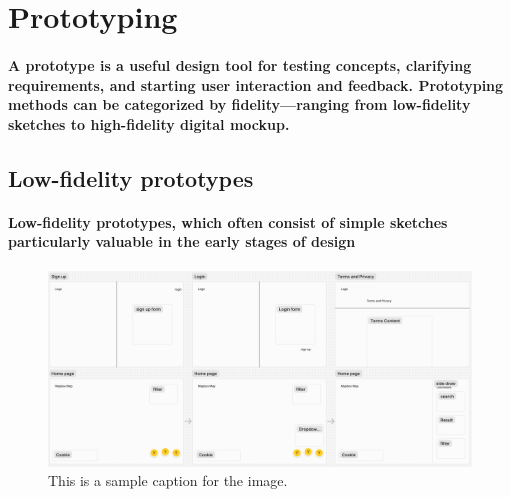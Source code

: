\section{Prototyping}

\paragraph{A prototype is a useful design tool for testing concepts, clarifying requirements, and starting user interaction and feedback.
Prototyping methods can be categorized by fidelity—ranging from low-fidelity sketches to high-fidelity digital mockup.}

\subsection{Low-fidelity prototypes}

\paragraph{Low-fidelity prototypes, which often consist of simple sketches particularly valuable in the early stages of design}

\begin{figure}[h]
    \centering
    \includegraphics[width=\textwidth]{images/sketch.jpg}
    \caption{This is a sample caption for the image.}
    \label{fig:sample-image}
\end{figure}